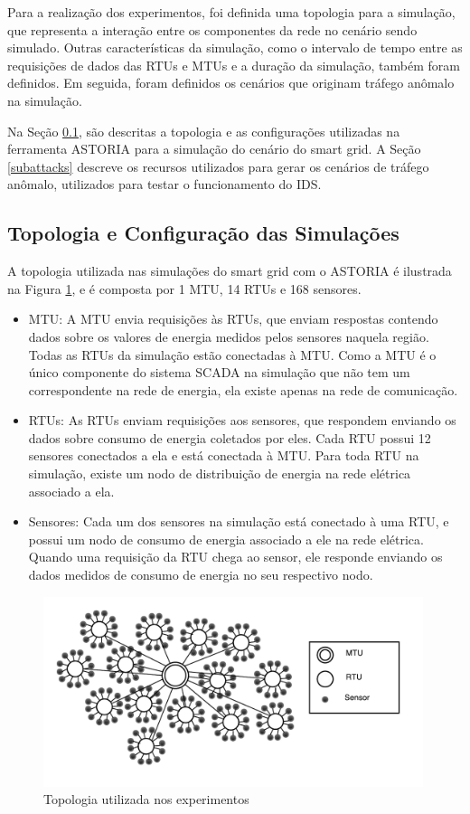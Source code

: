 \documentclass[cic,tc]{iiufrgs}
\begin{document}
Para a realização dos experimentos, foi definida uma topologia para a simulação, que representa a interação entre os componentes da rede no cenário sendo simulado. Outras características da simulação, como o intervalo de tempo entre as requisições de dados das RTUs e MTUs e a duração da simulação, também foram definidos. Em seguida, foram definidos os cenários que originam tráfego anômalo na simulação.

Na Seção \ref{subtopo}, são descritas a topologia e as configurações utilizadas na ferramenta ASTORIA para a simulação do cenário do smart grid. A Seção \ref{subattacks} descreve os recursos utilizados para gerar os cenários de tráfego anômalo, utilizados para testar o funcionamento do IDS.

\subsection{Topologia e Configuração das Simulações}
\label{subtopo}
A topologia utilizada nas simulações do smart grid com o ASTORIA é ilustrada na Figura \ref{figtopology}, e é composta por 1 MTU, 14 RTUs e 168 sensores.
\begin{itemize}
\item{MTU}: A MTU envia requisições às RTUs, que enviam respostas contendo dados sobre os valores de energia medidos pelos sensores naquela região. Todas as RTUs da simulação estão conectadas à MTU. Como a MTU é o único componente do sistema SCADA na simulação que não tem um correspondente na rede de energia, ela existe apenas na rede de comunicação.
\item{RTUs}: As RTUs enviam requisições aos sensores, que respondem enviando os dados sobre consumo de energia coletados por eles. Cada RTU possui 12 sensores conectados a ela e está conectada à MTU. Para toda RTU na simulação, existe um nodo de distribuição de energia na rede elétrica associado a ela.
\item{Sensores}: Cada um dos sensores na simulação está conectado à uma RTU, e possui um nodo de consumo de energia associado a ele na rede elétrica. Quando uma requisição da RTU chega ao sensor, ele responde enviando os dados medidos de consumo de energia no seu respectivo nodo.
\end{itemize}

\begin{figure}[h]
   \caption{Topologia utilizada nos experimentos}
   \begin{center}
       \includegraphics[width=30em]{topologia}
   \end{center}
   \label{figtopology}
\end{figure}
\end{document}
